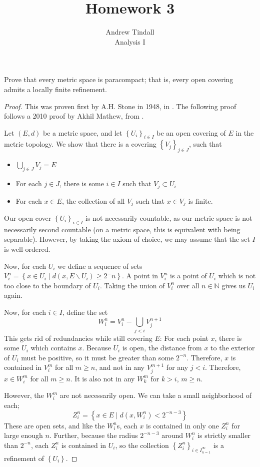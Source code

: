 \documentclass[12pt]{article}
\newcommand{\N}{\mathbb{N}}
\newcommand{\bs}{\backslash}
\theoremstyle{definition}
\newenvironment{problem}[2][Problem]{\begin{trivlist}
\item[\hskip \labelsep {\bfseries #1}\hskip \labelsep {\bfseries #2.}]}{\end{trivlist}}
\begin{document}
 
 
\title{Homework 3}
\author{Andrew Tindall\\
Analysis I}
 
\maketitle
\begin{problem}{1}
	Prove that every metric space is paracompact; that is, every open covering admits a locally finite refinement.
\end{problem}
\begin{proof}
	This was proven first by A.H. Stone in 1948, in \cite{stone}. The following proof follows a 2010 proof by Akhil Mathew, from \cite{mathew}.
	\par Let $(E, d)$ be a metric space, and let $\left\{ U_i \right\}_{i \in I}$ be an open covering of $E$ in the metric topology. We show that there is a covering $\left\{ V_j \right\}_{j \in J}$, such that 
	\begin{itemize}
		\item $\bigcup_{j \in J} V_j = E$
		\item For each $j \in J$, there is some $i \in I$ such that $V_j \subset U_i$
		\item For each $x \in E$, the collection of all $V_j$ such that $x \in V_j$ is finite.
	\end{itemize}
	Our open cover $\left\{ U_i \right\}_{i\in I}$ is not necessarily countable, as our metric space is not necessarily second countable (on a metric space, this is equivalent with being separable). However, by taking the axiom of choice, we may assume that the set $I$ is well-ordered. 
	\par Now, for each $U_i$ we define a sequence of sets $V_i^n = \left\{ x \in U_i\mid d(x, E \bs U_i) \geq 2^-n \right\}$. A point in $V_i^n$ is a point of $U_i$ which is not too close to the boundary of $U_i$. Taking the union of $V_i^n$ over all $n \in \N$ gives us $U_i$ again. 
	\par Now, for each $i \in I$, define the set
	\[ W_i^n = V_i^n - \bigcup_{j < i}V_j^{n+1}\]
	This gets rid of redundancies while still covering $E$: For each point $x$, there is some $U_i$ which contains $x$. Because $U_i$ is open, the distance from $x$ to the exterior of $U_i$ must be positive, so it must be greater than some $2^{-n}$. Therefore, $x$ is contained in $V_i^m$ for all $m \geq n$, and not in any $V_j^{m+1}$ for any $j < i$. Therefore, $x \in W_i^m$ for all $m \geq n$. It is also not in any $W_k^m$ for $k > i$, $m \geq n$. 
	\par However, the $W_i^m$ are not necessarily open. We can take a small neighborhood of each; 
	\[ Z_i^n = \left\{ x \in E \mid d(x, W_i^{n}) < 2^{-n-3} \right\} \]
	These are open sets, and like the $W_i^n$s, each $x$ is contained in only one $Z_i^n$ for large enough $n$. Further, because the radius $2^{-n-3}$ around $W_i^n$ is strictly smaller than $2^{-n}$, each $Z_i^n$ is contained in $U_i$, so the collection $\left\{ Z_i^n \right\}_{i\in I}_{n=1}^\infty$ is a refinement of $\left\{ U_i \right\}$.

\end{proof}
\end{document}
